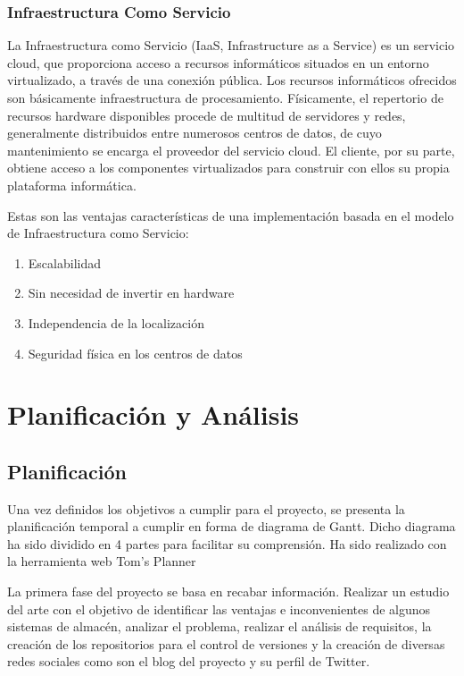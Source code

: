 \documentclass[a4paper,11pt]{book}
\begin{document}
\subsection{Infraestructura Como Servicio}
La Infraestructura como Servicio\cite{iaas} (IaaS, Infrastructure as a Service) es un servicio cloud, que proporciona acceso a recursos informáticos situados en un entorno virtualizado, a través de una conexión pública. Los recursos informáticos ofrecidos  son básicamente infraestructura de procesamiento. Físicamente, el repertorio de recursos hardware disponibles procede de multitud de servidores y redes, generalmente distribuidos entre numerosos centros de datos, de cuyo mantenimiento se encarga el proveedor del servicio cloud. El cliente, por su parte, obtiene acceso a los componentes virtualizados para construir con ellos su propia plataforma informática.

Estas son las ventajas características de una implementación basada en el modelo de Infraestructura como Servicio:

\begin{enumerate}
\item Escalabilidad
\item Sin necesidad de invertir en hardware
\item Independencia de la localización
\item Seguridad física en los centros de datos
\end{enumerate}




\chapter{Planificación y Análisis }

\section{Planificación}

Una vez definidos los objetivos a cumplir para el proyecto, se presenta la planificación temporal a cumplir en forma de diagrama de Gantt. Dicho diagrama ha sido dividido en 4 partes para facilitar su comprensión. Ha sido realizado con la herramienta web Tom's Planner\cite{tomsplanner}

La primera fase del proyecto se basa en recabar información. Realizar un estudio del arte con el objetivo de identificar las ventajas e inconvenientes de algunos sistemas de almacén, analizar el problema, realizar el análisis de requisitos, la creación de los repositorios para el control de versiones y la creación de diversas redes sociales como son el blog\cite{blog} del proyecto y su perfil\cite{twitter} de Twitter. 
\end{document}
